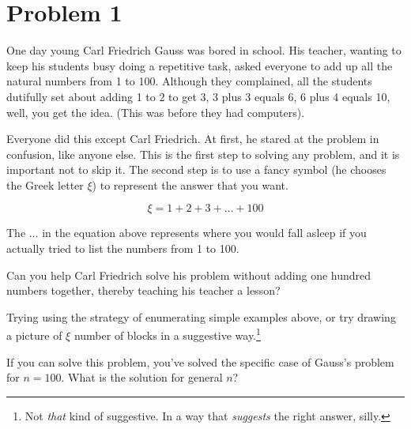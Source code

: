 \documentclass{article}
\begin{document}



\section{Problem 1}

One day young Carl Friedrich Gauss was bored in school.
His teacher, wanting to keep his students busy doing a repetitive
task, asked everyone to add up all the natural numbers from 1 to 100.
Although they complained, all the students dutifully set about
adding 1 to 2 to get 3, 3 plus 3 equals 6, 6 plus 4 equals 10, well,
you get the idea. (This was before they had computers).

Everyone did this except Carl Friedrich. At first, he stared
at the problem in confusion, like anyone else.
This is the first step to solving any problem, and it is
important not to skip it. The second step is to use a fancy
symbol (he chooses the Greek letter $\xi$) to represent the
answer that you want.

\begin{equation}
\xi = 1 + 2 + 3 + \ldots + 100
\end{equation}

The $\ldots$ in the equation above represents where you would fall
asleep if you actually tried to list the numbers from 1 to 100.

Can you help Carl Friedrich solve his problem without adding
one hundred numbers together, thereby teaching his teacher a lesson?

Trying using the strategy of enumerating simple examples above,
or try drawing a picture of $\xi$ number of blocks in a suggestive
way.\footnote{Not \emph{that} kind of suggestive. In a way that
\emph{suggests} the right answer, silly.}

If you can solve this problem, you've solved the specific case
of Gauss's problem for $n = 100$. What is the solution for
general $n$?
\end{document}
